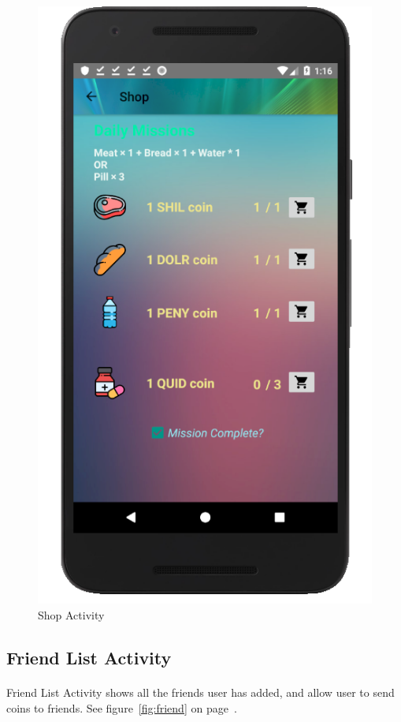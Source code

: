 \documentclass[12pt]{article}
\begin{document}
\begin{figure}
	\includegraphics[scale=0.25]{missionComplete.png}
	\caption{\label{fig:shop}Shop Activity}
\end{figure}

\subsection{Friend List Activity}
\paragraph{}
Friend List Activity shows all the friends user has added, and allow user to send coins to friends. See figure~\ref{fig:friend} on page~\pageref{fig:friend}.
\end{document}
